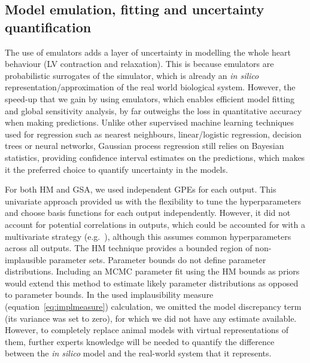 %
%
%
\subsection{Model emulation, fitting and uncertainty quantification}\label{sec:ch9model_emulation_fitting_and_uncertainty_quantification}The use of emulators adds a layer of uncertainty in modelling the whole heart behaviour (LV contraction and relaxation). This is because emulators are probabilistic surrogates of the simulator, which is already an \textit{in silico} representation/approximation of the real world biological system. However, the speed-up that we gain by using emulators, which enables efficient model fitting and global sensitivity analysis, by far outweighs the loss in quantitative accuracy when making predictions. Unlike other supervised machine learning techniques used for regression such as nearest neighbours, linear/logistic regression, decision trees or neural networks, Gaussian process regression still relies on Bayesian statistics, providing confidence interval estimates on the predictions, which makes it the preferred choice to quantify uncertainty in the models.

\vspace{0.2cm}
For both HM and GSA, we used independent GPEs for each output. This univariate approach provided us with the flexibility to tune the hyperparameters and choose basis functions for each output independently. However, it did not account for potential correlations in outputs, which could be accounted for with a multivariate strategy (e.g.~\cite{Conti:2009}), although this assumes common hyperparameters across all outputs. The HM technique provides a bounded region of non-implausible parameter sets. Parameter bounds do not define parameter distributions. Including an MCMC parameter fit using the HM bounds as priors would extend this method to estimate likely parameter distributions as opposed to parameter bounds. In the used implausibility measure (equation~\eqref{eq:implmeasure}) calculation, we omitted the model discrepancy term (its variance was set to zero), for which we did not have any estimate available. However, to completely replace animal models with virtual representations of them, further experts knowledge will be needed to quantify the difference between the \textit{in silico} model and the real-world system that it represents.

